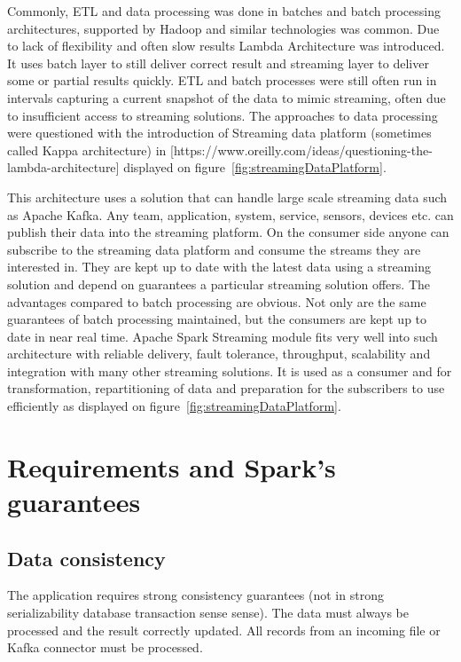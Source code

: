 \documentclass[a4paper, 10 pt, conference]{IEEEtran}
\begin{document}
Commonly, ETL and data processing was done in batches and batch processing architectures, supported by Hadoop and similar technologies was common. Due to lack of flexibility and often slow results Lambda Architecture was introduced. It uses batch layer to still deliver correct result and streaming layer to deliver some or partial results quickly.
ETL and batch processes were still often run in intervals capturing a current snapshot of the data to mimic streaming, often due to insufficient access to streaming solutions. The approaches to data processing were questioned with the introduction of Streaming data platform (sometimes called Kappa architecture) in [https://www.oreilly.com/ideas/questioning-the-lambda-architecture] displayed on figure~\ref{fig:streamingDataPlatform}.

This architecture uses a solution that can handle large scale streaming data such as Apache Kafka. Any team, application, system, service, sensors, devices etc. can publish their data into the streaming platform. On the consumer side anyone can subscribe to the streaming data platform and consume the streams they are interested in. They are kept up to date with the latest data using a streaming solution and depend on guarantees a particular streaming solution offers.
The advantages compared to batch processing are obvious. Not only are the same guarantees of batch processing maintained, but the consumers are kept up to date in near real time.
Apache Spark Streaming module fits very well into such architecture with reliable delivery, fault tolerance, throughput, scalability and integration with many other streaming solutions. It is used as a consumer and for transformation, repartitioning of data and preparation for the subscribers to use efficiently as displayed on figure~\ref{fig:streamingDataPlatform}.

\section{Requirements and Spark's guarantees}

\subsection{Data consistency}
The application requires strong consistency guarantees (not in strong serializability database transaction sense sense). The data must always be processed and the result correctly updated. All records from an incoming file or Kafka connector must be processed. 
\end{document}

